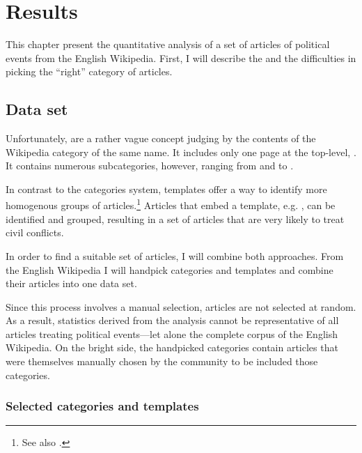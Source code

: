 \chapter{Results}\label{ch:results}

This chapter present the quantitative analysis of a set of articles of political events from the English Wikipedia.
First, I will describe the  and the difficulties in picking the ``right'' category of articles.

\section{Data set}\label{sec:datasets}

Unfortunately,  are a rather vague concept judging by the contents of the Wikipedia category of the same name.
It includes only one page at the top-level, .
It contains numerous subcategories, however, ranging from  and  to .

In contrast to the categories system, templates offer a way to identify more homogenous groups of articles.\footnote{See also .}
Articles that embed a template, e.g. , can be identified and grouped, resulting in a set of articles that are very likely to treat civil conflicts. 

In order to find a suitable set of articles, I will combine both approaches.
From the English Wikipedia I will handpick categories and templates and combine their articles into one data set.

Since this process involves a manual selection, articles are not selected at random.
As a result, statistics derived from the analysis cannot be representative of all articles treating political events---let alone the complete corpus of the English Wikipedia.
On the bright side, the handpicked categories contain articles that were themselves manually chosen by the community to be included those categories.

\subsection{Selected categories and templates}

